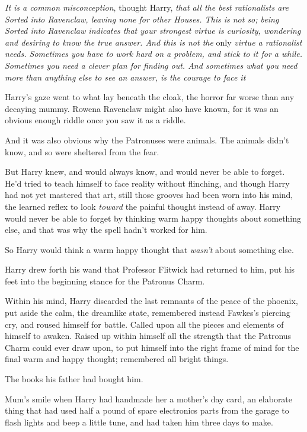 \emph{It is a common misconception}, thought Harry, \emph{that all the best
rationalists are Sorted into Ravenclaw, leaving none for other Houses. This is
not so; being Sorted into Ravenclaw indicates that your strongest virtue is
curiosity, wondering and desiring to know the true answer. And this is not the}
only \emph{virtue a rationalist needs. Sometimes you have to work hard on a
problem, and stick to it for a while. Sometimes you need a clever plan for
finding out. And sometimes what you need more than anything else to see an
answer, is the courage to face it{\el}}

Harry's gaze went to what lay beneath the cloak, the horror far worse than any
decaying mummy. Rowena Ravenclaw might also have known, for it was an obvious
enough riddle once you saw it as a riddle.

And it was also obvious why the Patronuses were animals. The animals didn't
know, and so were sheltered from the fear.

But Harry knew, and would always know, and would never be able to forget. He'd
tried to teach himself to face reality without flinching, and though Harry had
not yet mastered that art, still those grooves had been worn into his mind, the
learned reflex to look \emph{toward} the painful thought instead of away. Harry
would never be able to forget by thinking warm happy thoughts about something
else, and that was why the spell hadn't worked for him.

So Harry would think a warm happy thought that \emph{wasn't} about something
else.

Harry drew forth his wand that Professor Flitwick had returned to him, put his
feet into the beginning stance for the Patronus Charm.

Within his mind, Harry discarded the last remnants of the peace of the phoenix,
put aside the calm, the dreamlike state, remembered instead Fawkes's piercing
cry, and roused himself for battle. Called upon all the pieces and elements of
himself to awaken. Raised up within himself all the strength that the Patronus
Charm could ever draw upon, to put himself into the right frame of mind for the
final warm and happy thought; remembered all bright things.

The books his father had bought him.

Mum's smile when Harry had handmade her a mother's day card, an elaborate thing
that had used half a pound of spare electronics parts from the garage to flash
lights and beep a little tune, and had taken him three days to make.

